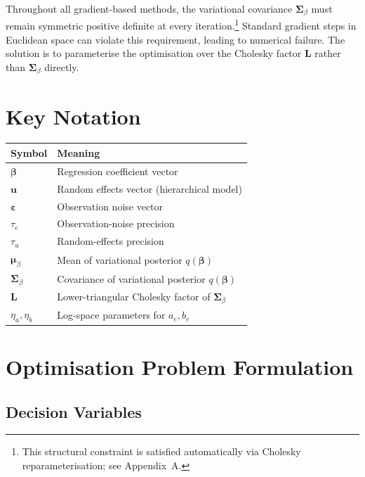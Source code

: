 \documentclass[11pt]{article}
\begin{document}
Throughout all gradient-based methods, the variational covariance $\bm{\Sigma}_\beta$ must remain symmetric positive definite at every iteration.\footnote{This structural constraint is satisfied automatically via Cholesky reparameterisation; see Appendix~A.} Standard gradient steps in Euclidean space can violate this requirement, leading to numerical failure. The solution is to parameterise the optimisation over the Cholesky factor $\bm{L}$ rather than $\bm{\Sigma}_\beta$ directly.

\section*{Key Notation}

\begin{center}
\begin{tabular}{ll}
\hline
Symbol & Meaning \\
\hline
$\bm{\beta}$ & Regression coefficient vector \\
$\bm{u}$ & Random effects vector (hierarchical model) \\
$\bm{\varepsilon}$ & Observation noise vector \\
$\tau_e$ & Observation-noise precision \\
$\tau_u$ & Random-effects precision \\
$\bm{\mu}_\beta$ & Mean of variational posterior $q(\bm{\beta})$ \\
$\bm{\Sigma}_\beta$ & Covariance of variational posterior $q(\bm{\beta})$ \\
$\bm{L}$ & Lower-triangular Cholesky factor of $\bm{\Sigma}_\beta$ \\
$\eta_a, \eta_b$ & Log-space parameters for $a_e, b_e$ \\
\hline
\end{tabular}
\end{center}
\newpage
\section*{Optimisation Problem Formulation}

\subsection*{Decision Variables}
\end{document}
